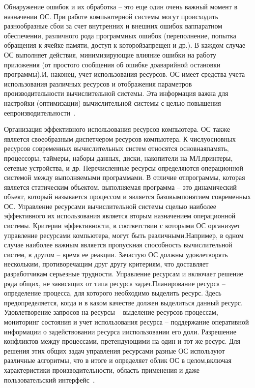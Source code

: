 Обнаружение ошибок и их обработка -- это еще один очень важный момент   в   назначении   ОС.   При   работе   компьютерной   системы   могут происходить разнообразные сбои за счет внутренних и внешних ошибок ваппаратном   обеспечении,   различного   рода   программных   ошибок (переполнение,   попытка   обращения   к   ячейке   памяти,   доступ   к   которойзапрещен и др.). В каждом случае ОС выполняет действия, минимизирующие влияние ошибки на работу приложения (от простого сообщения об ошибке доаварийной остановки программы).И, наконец, учет использования ресурсов. ОС  имеет средства учета использования   различных   ресурсов   и   отображения   параметров производительности  вычислительной системы. Эта информация важна для настройки (оптимизации) вычислительной системы с целью повышения еепроизводительности~\cite{Oc1}.

Организация   эффективного   использования   ресурсов   компьютера.   ОС также является своеобразным диспетчером ресурсов компьютера. К числуосновных ресурсов современных вычислительных систем относятся основнаяпамять, процессоры,   таймеры, наборы данных, диски, накопители на МЛ,принтеры, сетевые устройства, и др. Перечисленные ресурсы определяются операционной системой между выполняемыми программами. В отличие отпрограммы, которая является статическим объектом, выполняемая программа – это динамический объект, который называется процессом и является базовымпонятием современных ОС. Управление ресурсами вычислительной системы сцелью наиболее эффективного их использования является вторым назначением операционной системы. Критерии эффективности, в соответствии с которыми ОС организует управление ресурсами компьютера, могут быть различными.Например, в одном случае наиболее важным является пропускная способность вычислительной систем, в другом – время ее реакции. Зачастую ОС должны удовлетворять   нескольким,   противоречащим   друг   другу   критериям,   что доставляет   разработчикам   серьезные   трудности.   Управление   ресурсам и включает решение ряда общих, не зависящих от типа ресурса задач.Планирование ресурса – определение процесса, для которого необходимо выделить ресурс. Здесь предопределяется, когда и в каком качестве должен выделиться данный ресурс. Удовлетворение запросов на ресурсы – выделение ресурсов процессам, мониторинг состояния и учет использования ресурса – поддержание   оперативной   информации   о   задействовании   ресурса   ииспользовании   его   доли.   Разрешение   конфликтов   между   процессами, претендующими на один и тот же ресурс. Для   решения   этих   общих   задач   управления   ресурсами   разные   ОС используют различные алгоритмы, что в итоге и определяет облик ОС в целом,включая   характеристики   производительности,   область   применения   и   даже пользовательский интерфейс~\cite{Oc1}.

